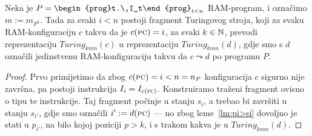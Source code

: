 \begin{propozicija}[{name=[{treći fragment transpiliranog stroja, izvršavanje instrukcija}]}]\label{prop:gadgets}
Neka je $P=\begin{prog}t.\,I_t\end{prog}_{t<n}$ RAM-program, i označimo $m:=m_{P^1}$. Tada za svaki $i<n$ postoji fragment Turingovog stroja, koji za svaku RAM-konfiguraciju $c$ takvu da je $c(\textsc{pc})=i$, za svaki $k\in{\mathbb N}$, prevodi reprezentaciju $Turing_{kmn}(c)$ u reprezentaciju $Turing_{kmn}(d)$, gdje smo s $d$ označili jedinstvenu RAM-konfiguraciju takvu da $c\leadsto d$ po programu $P$.
\end{propozicija}
\begin{proof}
Prvo primijetimo da zbog $c(\textsc{pc})=i<n=n_P$ konfiguracija $c$ sigurno nije završna, pa postoji instrukcija $I_i=I_{c(\textsc{pc})}$. Konstruiramo traženi fragment ovisno o tipu te instrukcije. Taj fragment počinje u stanju $s_i$, a trebao bi završiti u stanju $s_{i'}$, gdje smo označili $i':=d(\textsc{pc})$ --- no zbog leme~\ref{lm:pi>si} dovoljno je stati u $p_{i'}$, na bilo kojoj poziciji $p>k$, i s trakom kakva je u $Turing_{kmn}(d)$.


\end{proof}
